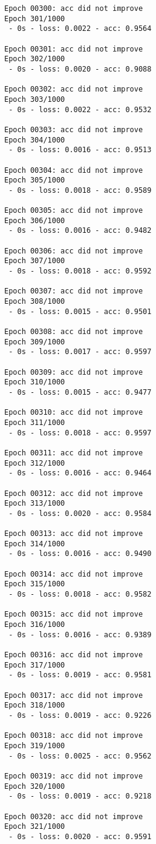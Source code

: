 \documentclass[11pt]{article}
\begin{document}
\begin{Verbatim}[commandchars=\\\{\}]
Epoch 00300: acc did not improve
Epoch 301/1000
 - 0s - loss: 0.0022 - acc: 0.9564

Epoch 00301: acc did not improve
Epoch 302/1000
 - 0s - loss: 0.0020 - acc: 0.9088

Epoch 00302: acc did not improve
Epoch 303/1000
 - 0s - loss: 0.0022 - acc: 0.9532

Epoch 00303: acc did not improve
Epoch 304/1000
 - 0s - loss: 0.0016 - acc: 0.9513

Epoch 00304: acc did not improve
Epoch 305/1000
 - 0s - loss: 0.0018 - acc: 0.9589

Epoch 00305: acc did not improve
Epoch 306/1000
 - 0s - loss: 0.0016 - acc: 0.9482

Epoch 00306: acc did not improve
Epoch 307/1000
 - 0s - loss: 0.0018 - acc: 0.9592

Epoch 00307: acc did not improve
Epoch 308/1000
 - 0s - loss: 0.0015 - acc: 0.9501

Epoch 00308: acc did not improve
Epoch 309/1000
 - 0s - loss: 0.0017 - acc: 0.9597

Epoch 00309: acc did not improve
Epoch 310/1000
 - 0s - loss: 0.0015 - acc: 0.9477

Epoch 00310: acc did not improve
Epoch 311/1000
 - 0s - loss: 0.0018 - acc: 0.9597

Epoch 00311: acc did not improve
Epoch 312/1000
 - 0s - loss: 0.0016 - acc: 0.9464

Epoch 00312: acc did not improve
Epoch 313/1000
 - 0s - loss: 0.0020 - acc: 0.9584

Epoch 00313: acc did not improve
Epoch 314/1000
 - 0s - loss: 0.0016 - acc: 0.9490

Epoch 00314: acc did not improve
Epoch 315/1000
 - 0s - loss: 0.0018 - acc: 0.9582

Epoch 00315: acc did not improve
Epoch 316/1000
 - 0s - loss: 0.0016 - acc: 0.9389

Epoch 00316: acc did not improve
Epoch 317/1000
 - 0s - loss: 0.0019 - acc: 0.9581

Epoch 00317: acc did not improve
Epoch 318/1000
 - 0s - loss: 0.0019 - acc: 0.9226

Epoch 00318: acc did not improve
Epoch 319/1000
 - 0s - loss: 0.0025 - acc: 0.9562

Epoch 00319: acc did not improve
Epoch 320/1000
 - 0s - loss: 0.0019 - acc: 0.9218

Epoch 00320: acc did not improve
Epoch 321/1000
 - 0s - loss: 0.0020 - acc: 0.9591


\end{Verbatim}
\end{document}

